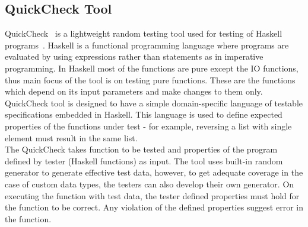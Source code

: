 \subsection{QuickCheck Tool}
QuickCheck~\cite{Claessen2000} is a lightweight random testing tool used for testing of Haskell programs~\cite{Hudak2007}. Haskell is a functional programming language where programs are evaluated by using expressions rather than statements as in imperative programming. In Haskell most of the functions are pure except the IO functions, thus main focus of the tool is on testing pure functions. These are the functions which depend on its input parameters and make changes to them only. QuickCheck tool is designed to have a simple domain-specific language of testable specifications embedded in Haskell. This language is used to define expected properties of the functions under test - for example, reversing a list with single element must result in the same list.\\ %
\indent The QuickCheck takes function to be tested and properties of the program defined by tester (Haskell functions) as input. The tool uses built-in random generator to generate effective test data, however, to get adequate coverage in the case of custom data types, the testers can also develop their own generator. On executing the function with test data, the tester defined properties must hold for the function to be correct. Any violation of the defined properties suggest error in the function.








